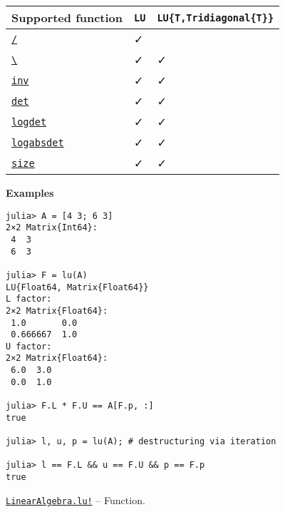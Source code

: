 \begin{adjustwidth}{2em}{0pt}
\begin{table}[h]
\begin{tabulary}{\linewidth}{|L|L|L|}
\hline
Supported function & \texttt{LU} & \texttt{LU\{T,Tridiagonal\{T\}\}} \\
\hline
\hyperlink{4103478871488785445}{\texttt{/}} & ✓ &  \\
\hline
\hyperlink{2092789550033334797}{\texttt{{\textbackslash}}} & ✓ & ✓ \\
\hline
\hyperlink{13336866048543706848}{\texttt{inv}} & ✓ & ✓ \\
\hline
\hyperlink{16543378577000914469}{\texttt{det}} & ✓ & ✓ \\
\hline
\hyperlink{12765142073947245963}{\texttt{logdet}} & ✓ & ✓ \\
\hline
\hyperlink{11067048979448481853}{\texttt{logabsdet}} & ✓ & ✓ \\
\hline
\hyperlink{17888996102305087038}{\texttt{size}} & ✓ & ✓ \\
\hline
\end{tabulary}

\end{table}

\textbf{Examples}


\begin{verbatim}
julia> A = [4 3; 6 3]
2×2 Matrix{Int64}:
 4  3
 6  3

julia> F = lu(A)
LU{Float64, Matrix{Float64}}
L factor:
2×2 Matrix{Float64}:
 1.0       0.0
 0.666667  1.0
U factor:
2×2 Matrix{Float64}:
 6.0  3.0
 0.0  1.0

julia> F.L * F.U == A[F.p, :]
true

julia> l, u, p = lu(A); # destructuring via iteration

julia> l == F.L && u == F.U && p == F.p
true
\end{verbatim}



\end{adjustwidth}
\hypertarget{3268903080173564842}{}
\hyperlink{3268903080173564842}{\texttt{LinearAlgebra.lu!}}  -- {Function.}

